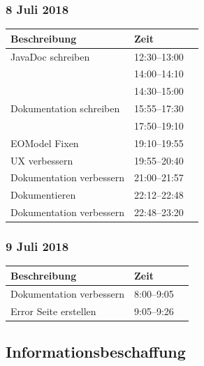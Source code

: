 \documentclass[a4paper, 11pt]{article}
\begin{document}
\subsubsection{8 Juli 2018}

\begin{tabular}{llr}
\toprule
Beschreibung & Zeit \\
\midrule
JavaDoc schreiben & 12:30--13:00 \\
 & 14:00--14:10 \\
 & 14:30--15:00\\
Dokumentation schreiben & 15:55--17:30 \\
 & 17:50--19:10 \\
EOModel Fixen & 19:10--19:55 \\
UX verbessern & 19:55--20:40 \\
Dokumentation verbessern & 21:00--21:57 \\
Dokumentieren & 22:12--22:48 \\
Dokumentation verbessern & 22:48--23:20 \\
\bottomrule
\end{tabular}

\subsubsection{9 Juli 2018}

\begin{tabular}{llr}
\toprule
Beschreibung & Zeit \\
\midrule
Dokumentation verbessern & 8:00--9:05 \\
Error Seite erstellen & 9:05--9:26 \\
\bottomrule
\end{tabular}

\subsection{Informationsbeschaffung}
\end{document}
